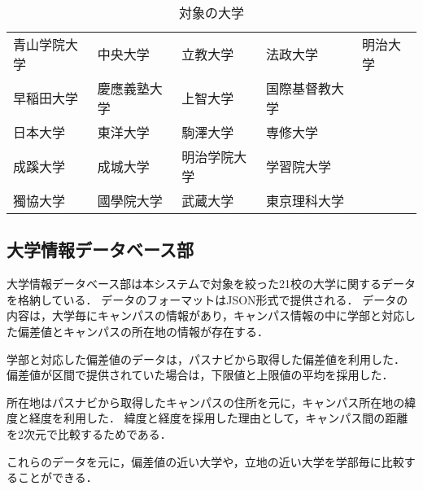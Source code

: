 \begin{table}[htbp]
\caption{対象の大学}
\centering
\begin{tabular}{|lllll|}
\hline
青山学院大学 & 中央大学 & 立教大学 & 法政大学 & 明治大学\\
早稲田大学 & 慶應義塾大学 & 上智大学 & 国際基督教大学 & \\
日本大学 & 東洋大学 & 駒澤大学 & 専修大学 & \\
成蹊大学 & 成城大学 & 明治学院大学 & 学習院大学 & \\
獨協大学 & 國學院大学 & 武蔵大学 & 東京理科大学 & \\  \hline
\end{tabular}
\label{table:univs}
\end{table}

\subsection{大学情報データベース部}
大学情報データベース部は本システムで対象を絞った21校の大学に関するデータを格納している．
データのフォーマットはJSON形式で提供される．
データの内容は，大学毎にキャンパスの情報があり，キャンパス情報の中に学部と対応した偏差値とキャンパスの所在地の情報が存在する．

学部と対応した偏差値のデータは，パスナビから取得した偏差値を利用した．
偏差値が区間で提供されていた場合は，下限値と上限値の平均を採用した．

所在地はパスナビから取得したキャンパスの住所を元に，キャンパス所在地の緯度と経度を利用した．
緯度と経度を採用した理由として，キャンパス間の距離を2次元で比較するためである．

これらのデータを元に，偏差値の近い大学や，立地の近い大学を学部毎に比較することができる．
